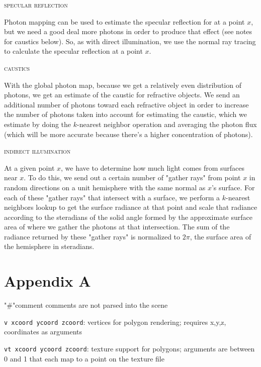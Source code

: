 \documentclass{article}
\begin{document}
\begin{center}\textsc{specular reflection}\end{center} 
Photon mapping can be used to estimate the specular reflection for at a point $x$, but we need a good deal more photons in order to produce that effect (see notes for caustics below). So, as with direct illumination, we use the normal ray tracing to calculate the specular reflection at a point $x$.

\begin{center}\textsc{caustics}\end{center} 
With the global photon map, because we get a relatively even distribution of photons, we get an estimate of the caustic for refractive objects. We send an additional number of photons toward each refractive object in order to increase the number of photons taken into account for estimating the caustic, which we estimate by doing the $k$-nearest neighbor operation and averaging the photon flux (which will be more accurate because there's a higher concentration of photons).

\begin{center}\textsc{indirect illumination}\end{center} 
At a given point $x$, we have to determine how much light comes from surfaces near $x$. To do this, we send out a certain number of "gather rays" from point $x$ in random directions on a unit hemisphere with the same normal as $x$'s surface. For each of these "gather rays" that intersect with a surface, we perform a $k$-nearest neighbors lookup to get the surface radiance at that point and scale that radiance according to the steradians of the solid angle formed by the approximate surface area of where we gather the photons at that intersection. The sum of the radiance returned by these "gather rays" is normalized to $2\pi$, the surface area of the hemisphere in steradians.

	

\section*{Appendix A} %
\label{sec:appendixa}
"\#"comment
comments are not parsed into the scene

\verb+v xcoord ycoord zcoord+:
vertices for polygon rendering; requires x,y,z, coordinates as arguments

\verb+vt xcoord ycoord zcoord+:
texture support for polygons; arguments are between 0 and 1 that each map to a point on the texture file
\end{document}
